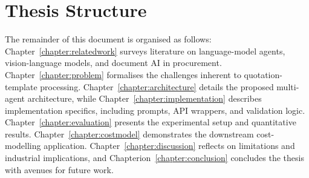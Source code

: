 \section{Thesis Structure }
The remainder of this document is organised as follows:  
Chapter~\ref{chapter:relatedwork} surveys literature on language-model agents, vision-language models, and document AI in procurement.  
Chapter~\ref{chapter:problem} formalises the challenges inherent to quotation-template processing.  
Chapter~\ref{chapter:architecture} details the proposed multi-agent architecture, while Chapter~\ref{chapter:implementation} describes implementation specifics, including prompts, API wrappers, and validation logic.  
Chapter~\ref{chapter:evaluation} presents the experimental setup and quantitative results.  
Chapter~\ref{chapter:costmodel} demonstrates the downstream cost-modelling application.  
Chapter~\ref{chapter:discussion} reflects on limitations and industrial implications, and Chapterion~\ref{chapter:conclusion} concludes the thesis with avenues for future work.
